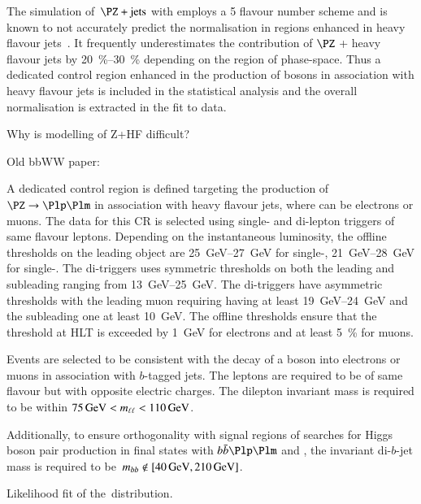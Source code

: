 
The simulation of~$\PZ+\text{jets}$ with  employs a 5
flavour number scheme and is known to not accurately predict the
normalisation in regions enhanced in heavy flavour
jets~\cite{HIGG-2016-29,STDM-2017-38}. It frequently underestimates the
contribution of $\PZ$ + heavy flavour jets by
\SIrange{20}{30}{\percent} depending on the region of
phase-space. Thus a dedicated control region enhanced in the
production of \PZ bosons in association with heavy flavour jets is
included in the statistical analysis and the overall normalisation is
extracted in the fit to data.

Why is modelling of Z+HF difficult?

Old bbWW paper: \cite{HDBS-2018-33}

A dedicated control region is defined targeting the production of
$\PZ \ra \Plp\Plm$ in association with heavy flavour jets, where \Pl
can be electrons or muons. The data for this CR is selected using
single- and di-lepton triggers of same flavour leptons. Depending on
the instantaneous luminosity, the offline thresholds on the leading
object \pT are \SIrange{25}{27}{\GeV} for single-\Pe,
\SIrange{21}{28}{\GeV} for single-\Pmu. The di-\Pe triggers uses
symmetric \pT thresholds on both the leading and subleading ranging
from \SIrange{13}{25}{\GeV}. The di-\Pmu triggers have asymmetric
thresholds with the leading muon requiring having at least
\SIrange{19}{24}{\GeV} \pT and the subleading one at least
\SI{10}{\GeV}. The offline \pT thresholds ensure that the threshold at
HLT is exceeded by \SI{1}{\GeV} for electrons and at least
\SI{5}{\percent} for muons.

Events are selected to be consistent with the decay of a \PZ boson
into electrons or muons in association with $b$-tagged jets. The
leptons are required to be of same flavour but with opposite electric
charges. The dilepton invariant mass is required to be within
$\SI{75}{\ensuremath{\text{GeV}}} < m_{\ell\ell} < \SI{110}{\ensuremath{\text{GeV}}}$.

Additionally, to ensure orthogonality with signal regions of searches
for Higgs boson pair production in final states with $\bbbar\Plp\Plm$
and \MET, the invariant di-$b$-jet mass is required to
be~$\mBB \not\in [\SI{40}{\GeV}, \SI{210}{\GeV}]$.








Likelihood fit of the~\mll distribution.

